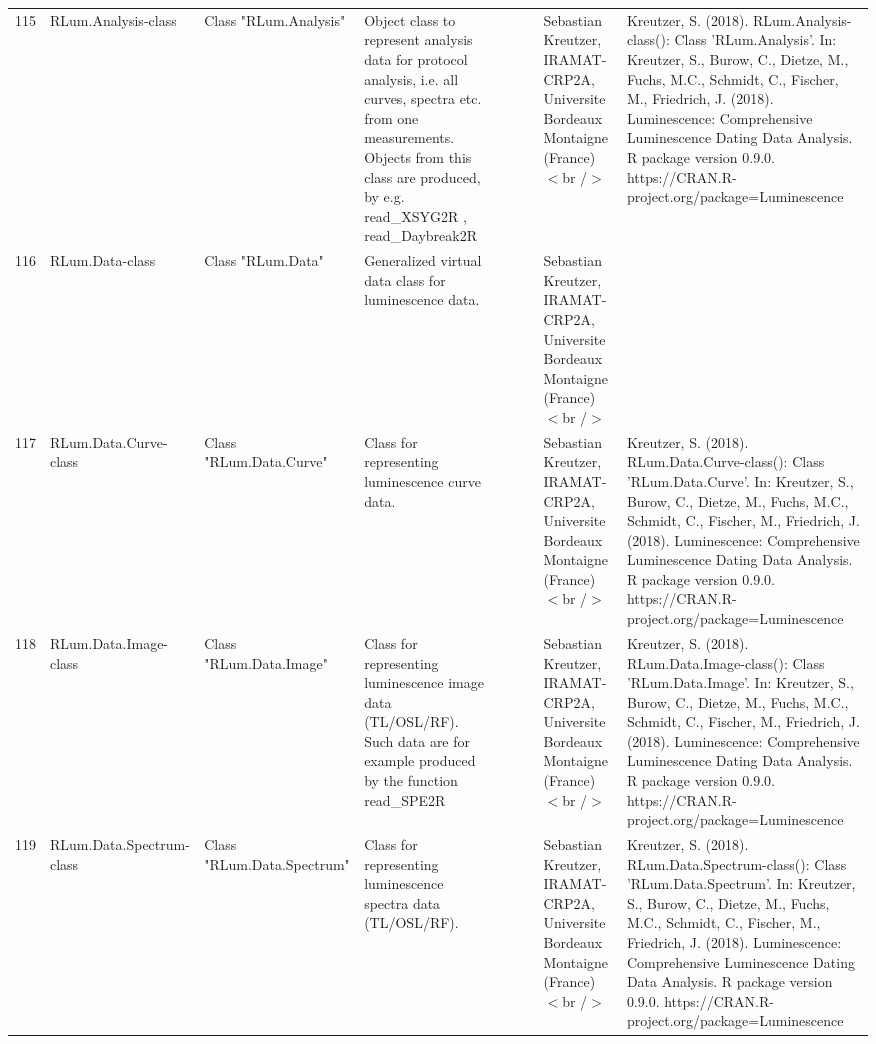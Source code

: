 \begin{table}[ht]
\begin{tabular}{rllllllll}
 \\ 
  115 & RLum.Analysis-class & Class  "RLum.Analysis" & Object class to represent analysis data for protocol analysis, i.e. all curves, spectra etc. from one measurements. Objects from this class are produced, by e.g.  read\_XSYG2R ,  read\_Daybreak2R &  &  &  & Sebastian Kreutzer, IRAMAT-CRP2A, Universite Bordeaux Montaigne (France)$<$br /$>$ & Kreutzer, S. (2018). RLum.Analysis-class(): Class 'RLum.Analysis'. In: Kreutzer, S., Burow, C., Dietze, M., Fuchs, M.C., Schmidt, C., Fischer, M., Friedrich, J. (2018). Luminescence: Comprehensive Luminescence Dating Data Analysis. R package version 0.9.0. https://CRAN.R-project.org/package=Luminescence
 \\ 
  116 & RLum.Data-class & Class  "RLum.Data" & Generalized virtual data class for luminescence data. &  &  &  & Sebastian Kreutzer, IRAMAT-CRP2A, Universite Bordeaux Montaigne (France)$<$br /$>$ &  \\ 
  117 & RLum.Data.Curve-class & Class  "RLum.Data.Curve" & Class for representing luminescence curve data. &  &  &  & Sebastian Kreutzer, IRAMAT-CRP2A, Universite Bordeaux Montaigne (France)$<$br /$>$ & Kreutzer, S. (2018). RLum.Data.Curve-class(): Class 'RLum.Data.Curve'. In: Kreutzer, S., Burow, C., Dietze, M., Fuchs, M.C., Schmidt, C., Fischer, M., Friedrich, J. (2018). Luminescence: Comprehensive Luminescence Dating Data Analysis. R package version 0.9.0. https://CRAN.R-project.org/package=Luminescence
 \\ 
  118 & RLum.Data.Image-class & Class  "RLum.Data.Image" & Class for representing luminescence image data (TL/OSL/RF). Such data are for example produced by the function  read\_SPE2R &  &  &  & Sebastian Kreutzer, IRAMAT-CRP2A, Universite Bordeaux Montaigne (France)$<$br /$>$ & Kreutzer, S. (2018). RLum.Data.Image-class(): Class 'RLum.Data.Image'. In: Kreutzer, S., Burow, C., Dietze, M., Fuchs, M.C., Schmidt, C., Fischer, M., Friedrich, J. (2018). Luminescence: Comprehensive Luminescence Dating Data Analysis. R package version 0.9.0. https://CRAN.R-project.org/package=Luminescence
 \\ 
  119 & RLum.Data.Spectrum-class & Class  "RLum.Data.Spectrum" & Class for representing luminescence spectra data (TL/OSL/RF). &  &  &  & Sebastian Kreutzer, IRAMAT-CRP2A, Universite Bordeaux Montaigne (France)$<$br /$>$ & Kreutzer, S. (2018). RLum.Data.Spectrum-class(): Class 'RLum.Data.Spectrum'. In: Kreutzer, S., Burow, C., Dietze, M., Fuchs, M.C., Schmidt, C., Fischer, M., Friedrich, J. (2018). Luminescence: Comprehensive Luminescence Dating Data Analysis. R package version 0.9.0. https://CRAN.R-project.org/package=Luminescence

\end{tabular}
\end{table}
